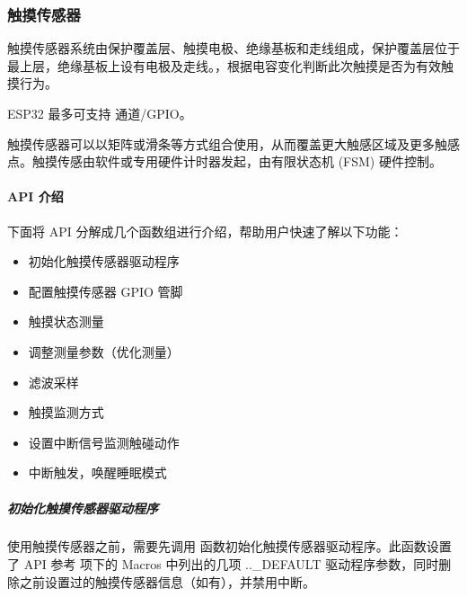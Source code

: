 \documentclass[a4paper,12pt,english]{sphinxmanual}
\begin{document}
{{\subsubsection{触摸传感器}
\label{\detokenize{exp-esp32/peripherals/touch:id1}}\label{\detokenize{exp-esp32/peripherals/touch::doc}}
\sphinxAtStartPar
触摸传感器系统由保护覆盖层、触摸电极、绝缘基板和走线组成，保护覆盖层位于最上层，绝缘基板上设有电极及走线。，根据电容变化判断此次触摸是否为有效触摸行为。

\sphinxAtStartPar
ESP32 最多可支持 通道/GPIO。

\sphinxAtStartPar
触摸传感器可以以矩阵或滑条等方式组合使用，从而覆盖更大触感区域及更多触感点。触摸传感由软件或专用硬件计时器发起，由有限状态机 (FSM) 硬件控制。


\paragraph{API 介绍}
\label{\detokenize{exp-esp32/peripherals/touch:api}}
\sphinxAtStartPar
下面将 API 分解成几个函数组进行介绍，帮助用户快速了解以下功能：
\begin{itemize}
\item {} 
\sphinxAtStartPar
初始化触摸传感器驱动程序

\item {} 
\sphinxAtStartPar
配置触摸传感器 GPIO 管脚

\item {} 
\sphinxAtStartPar
触摸状态测量

\item {} 
\sphinxAtStartPar
调整测量参数（优化测量）

\item {} 
\sphinxAtStartPar
滤波采样

\item {} 
\sphinxAtStartPar
触摸监测方式

\item {} 
\sphinxAtStartPar
设置中断信号监测触碰动作

\item {} 
\sphinxAtStartPar
中断触发，唤醒睡眠模式

\end{itemize}


\subparagraph{初始化触摸传感器驱动程序}
\label{\detokenize{exp-esp32/peripherals/touch:id2}}
\sphinxAtStartPar
使用触摸传感器之前，需要先调用  函数初始化触摸传感器驱动程序。此函数设置了 API 参考 项下的 Macros 中列出的几项 ..\_DEFAULT 驱动程序参数，同时删除之前设置过的触摸传感器信息（如有），并禁用中断。

}}
\end{document}
